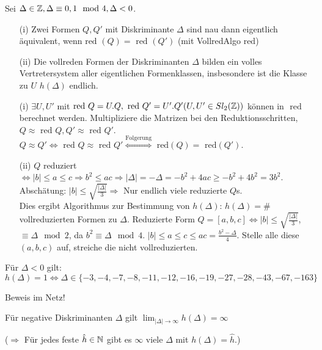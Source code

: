 \documentclass[a4paper,DIV15,BCOR12mm]{article}
\begin{document}
\begin{satz}
Sei $\Delta \in \mathbb{Z}, \Delta \equiv 0,1 \mod 4, \Delta < 0$.
\begin{itemize}
\item[(i)] Zwei Formen $Q, Q'$ mit Diskriminante $\Delta$ sind nau dann eigentlich äquivalent, wenn $\text{red }(Q) = \text{ red }(Q')$ (mit VollredAlgo $\text{red}$)
\item[(ii)] Die vollreden Formen der Diskriminanten $\Delta$ bilden ein volles Vertretersystem aller eigentlichen Formenklassen, insbesondere ist die Klasse zu $U$ $h(\Delta)$ endlich.
\end{itemize}
\end{satz}

\begin{beweis}
\begin{itemize}
\item [(i)] $\exists U, U'$ mit $\text{red }Q = U.Q, \text{ red }Q' = U'.Q' (U, U' \in Sl_2(\mathbb{Z}))$ können in $\text{ red }$ berechnet werden. Multipliziere die Matrizen bei den Reduktionsschritten, $Q \approx \text{ red }Q, Q' \approx \text{ red }Q'$. $Q \approx Q' \Leftrightarrow \text{ red }Q \approx \text{ red }Q' \stackrel{\text{Folgerung}}{\Leftrightarrow} \text{ red}(Q) = \text{ red}(Q')$.
\item[(ii)] $Q$ reduziert $\Leftrightarrow |b| \le a \le c \Rightarrow b^2 \le ac \Rightarrow |\Delta| = -\Delta = -b^2 + 4ac \ge -b^2 + 4b^2 = 3b^2$. Abschätung: $|b| \le \sqrt{\frac{|\Delta|}{3}} \Rightarrow$ Nur endlich viele reduzierte $Q$s.\\
Dies ergibt Algorithmus zur Bestimmung von $h(\Delta)$: $h(\Delta) = \#$ vollreduzierten Formen zu $\Delta$. Reduzierte Form $Q = [a,b,c] \Leftrightarrow |b| \le \sqrt{\frac{|\Delta|}{3}}$, $\equiv \Delta \mod 2$, da $b^2 \equiv \Delta \mod 4$. $|b| \le a \le c \le ac = \frac{b^2 - \Delta}{4}$. Stelle alle diese $(a,b,c)$ auf, streiche die nicht vollreduzierten.
\end{itemize}
\end{beweis}

\begin{satz}
Für $\Delta < 0$ gilt: $h(\Delta) = 1 \Leftrightarrow \Delta \in \{-3,-4,-7,-8,-11,-12,-16,-19,-27,-28,-43,-67,-163\}$
\end{satz}
Beweis im Netz!

\begin{satz}[Siegel]
Für negative Diskriminanten $\Delta$ gilt $\lim_{|\Delta| \to \infty} h(\Delta) = \infty$
\end{satz}
($\Rightarrow$ Für jedes feste $\hat h \in \mathbb{N}$ gibt es $\infty$ viele $\Delta$ mit $h(\Delta) = \hat h$.)
\end{document}
